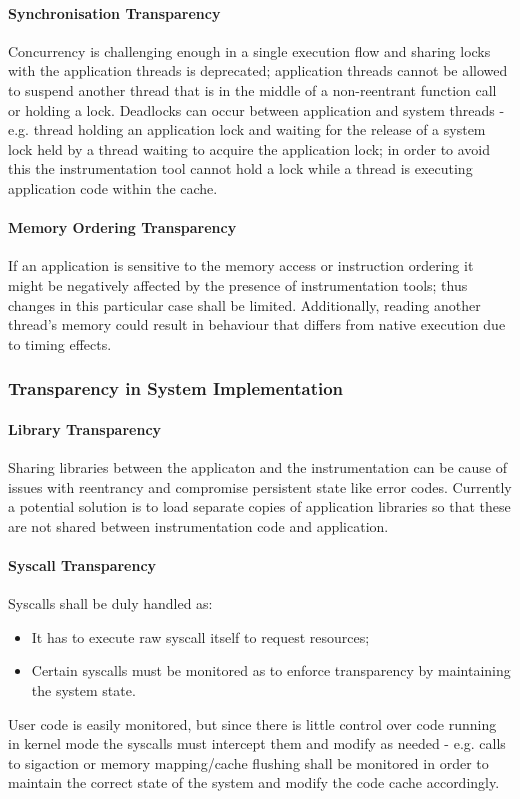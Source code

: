 \paragraph{Synchronisation Transparency} Concurrency is challenging enough in a single execution flow and sharing locks
with the application threads is deprecated; application threads cannot be allowed to suspend another thread that is in
the middle of a non-reentrant function call or holding a lock. Deadlocks can occur between application and system
threads - e.g. thread holding an application lock and waiting for the release of a system lock held by a thread waiting
to acquire the application lock; in order to avoid this the instrumentation tool cannot hold a lock while a thread is
executing application code within the cache.
\paragraph{Memory Ordering Transparency} If an application is sensitive to the memory access or instruction ordering it
might be negatively affected by the presence of instrumentation tools; thus changes in this particular case shall be
limited. Additionally, reading another thread's memory could result in behaviour that differs from native execution due
to timing effects.

\subsubsection{Transparency in System Implementation}
\paragraph{Library Transparency} Sharing libraries between the applicaton and the instrumentation can be cause of
issues with reentrancy and compromise persistent state like error codes. Currently a potential solution is to load
separate copies of application libraries so that these are not shared between instrumentation code and application.
\paragraph{Syscall Transparency} Syscalls shall be duly handled as: 
\begin{itemize}
    \item It has to execute raw syscall itself to request resources;
    \item Certain syscalls must be monitored as to enforce transparency by maintaining the system state.
\end{itemize}
User code is easily monitored, but since there is little control over code running in kernel mode the syscalls must
intercept them and modify as needed - e.g. calls to {\ttfamily sigaction} or memory mapping/cache flushing shall be
monitored in order to maintain the correct state of the system and modify the code cache accordingly.
